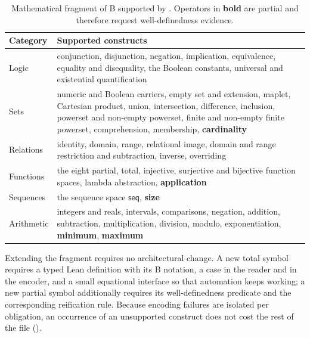 \begin{table}[t]
  \centering
  \small
  \begin{tabular}{p{.18\linewidth}p{.73\linewidth}}
    \toprule
    Category & Supported constructs \\
    \midrule
    Logic & conjunction, disjunction, negation, implication, equivalence, equality and
      disequality, the Boolean constants, universal and existential quantification \\
    Sets & numeric and Boolean carriers, empty set and extension, maplet, Cartesian
      product, union, intersection, difference, inclusion, powerset and non-empty
      powerset, finite and non-empty finite powerset, comprehension, membership,
      \textbf{cardinality} \\
    Relations & identity, domain, range, relational image, domain and range restriction and
      subtraction, inverse, overriding \\
    Functions & the eight partial, total, injective, surjective and bijective function
      spaces, lambda abstraction, \textbf{application} \\
    Sequences & the sequence space \(\mathsf{seq}\), \textbf{size} \\
    Arithmetic & integers and reals, intervals, comparisons, negation, addition,
      subtraction, multiplication, division, modulo, exponentiation, \textbf{minimum},
      \textbf{maximum} \\
    \bottomrule
  \end{tabular}
  \caption{Mathematical fragment of B supported by \barrel{}. Operators in \textbf{bold}
    are partial and therefore request well-definedness evidence.}
  \label{tab:barrel-fragment}
\end{table}

Extending the fragment requires no architectural change.
A new total symbol requires a typed Lean definition with its B notation, a case in the
reader and in the encoder, and a small equational interface so that automation keeps
working; a new partial symbol additionally requires its well-definedness predicate and the
corresponding reification rule.
Because encoding failures are isolated per obligation, an occurrence of an unsupported
construct does not cost the rest of the file ().
